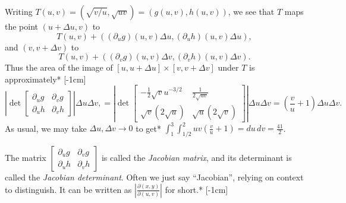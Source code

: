 \documentclass[svgnames]{watsonbook}
\begin{document}
\begin{solution}
  Writing $T(u,v) =
  (\sqrt{v/u}, \sqrt{uv}) = (g(u,v), h(u,v))$, we see that $T$ maps
  the point $(u+\Delta u, v)$ to
  \begin{equation} \label{eq:Tv}
    T(u,v) + ((\partial_u g)(u,v) \Delta u,
    (\partial_u h)(u,v) \Delta u), 
  \end{equation}
  and
  $(v, v+\Delta v)$ to
  \begin{equation} \label{eq:Tu}
    T(u,v) + ((\partial_v g)(u,v) \Delta v,
    (\partial_v h)(u,v) \Delta v). 
  \end{equation}
  Thus the area of the image of $[u, u+\Delta u] \times [v, v + \Delta
  v]$ under $T$ is approximately* [-1cm]
  \[
    \left| \det \left[
      \begin{array}{cc}
        \partial_u g & \partial _v g \\
        \partial_u h & \partial _v h
      \end{array} \right]
    \right| \Delta u \Delta v,  =
    \left| \det \left[
      \begin{array}{cc}
        -\frac{1}{2}\sqrt{v}u^{-3/2} & \frac{1}{2\sqrt{uv}} \\
        \sqrt{v}(2\sqrt{u}) & \sqrt{u}(2\sqrt{v})
      \end{array} \right]
      \right| \Delta u \Delta v  = \left(\frac{v}{u} + 1\right)
      \Delta u \Delta v. 
    \]
    As usual, we may take $\Delta u, \Delta v \to 0$ to get*
    $\displaystyle{\int_{1}^{3}\int_{1/2}^{2}uv \left(\frac{v}{u} + 1\right) = 
    du \, dv = \boxed{\frac{41}{2}}}$. 
  \end{solution}

  The matrix $\left[
      \begin{array}{cc}
        \partial_u g & \partial _v g \\
        \partial_u h & \partial _v h
      \end{array} \right]$ is called the \textit{Jacobian matrix}, and
    its determinant is called the \textit{Jacobian determinant}. Often we just say
    ``Jacobian'', relying on context to distinguish. It can be written
    as $\left|\frac{\partial (x,y)}{\partial (u,v)} \right|$ for
    short.* [-1cm]
    
\end{document}
